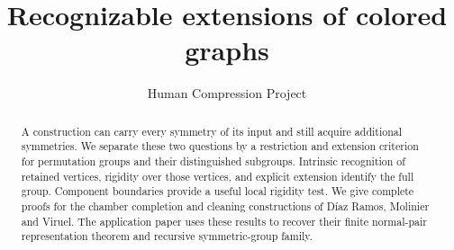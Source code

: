 
\title{Recognizable extensions of colored graphs}
\author{Human Compression Project}
\date{}

\maketitle
\begin{abstract}
A construction can carry every symmetry of its input and still acquire additional
symmetries. We separate these two questions by a restriction and extension
criterion for permutation groups and their distinguished subgroups. Intrinsic
recognition of retained vertices, rigidity over those vertices, and explicit
extension identify the full group. Component boundaries provide a useful local
rigidity test. We give complete proofs for the chamber completion and cleaning
constructions of D\'iaz Ramos, Molinier and Viruel. The application paper uses
these results to recover their finite normal-pair representation theorem and
recursive symmetric-group family.
\end{abstract}





